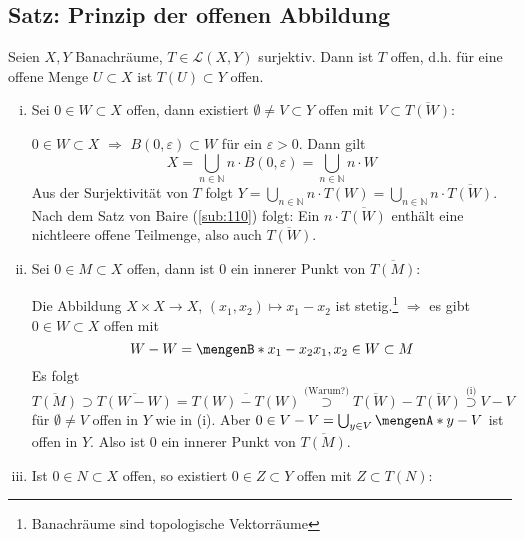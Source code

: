 \subsection{Satz: Prinzip der offenen Abbildung} %
\label{sub:38}
Seien $X,Y$ Banachräume, $T \in \mathcal{L}(X,Y)$ surjektiv. Dann ist $T$ offen, d.h. für eine offene Menge $U \subset X$ ist $T(U) \subset Y$ offen.
\begin{enumerate}[(i)]
	\item Sei $0 \in W \subset X$ offen, dann existiert $\emptyset \not= V \subset Y$ offen mit $V \subset \overline{T(W)}$: 
	
	$0 \in W \subset X$ $\Rightarrow $ $B(0,\varepsilon) \subset W$ für ein $\varepsilon>0$. Dann gilt
	\[
		X=\bigcup_{n \in \mathds{N}} n \cdot B(0,\varepsilon) = \bigcup_{n \in \mathds{N}} n \cdot W
	\]
	Aus der Surjektivität von $T$ folgt $Y = \bigcup_{n \in \mathds{N} }n \cdot T(W) = \bigcup_{n \in \mathds{N}} n \cdot \overline{T(W)}$. Nach dem Satz von Baire 
	(\ref{sub:110}) folgt: Ein $n \cdot \overline{T(W)}$ enthält eine nichtleere offene Teilmenge, also auch $\overline{T(W)}$.
	\item Sei $0 \in M \subset X$ offen, dann ist $0$ ein innerer Punkt von $\overline{T(M)}$: 
	
	Die Abbildung $X \times X \to X$, $(x_1,x_2) \mapsto x_1 -x_2$ ist stetig.\footnote{Banachräume sind topologische Vektorräume} $\Rightarrow$ es gibt $0 \in W \subset X$ 
	offen mit
	\[
		W - W = \set[x_1 -x_2]{x_1,x_2 \in W} \subset M 
	\]
	Es folgt 
	\[
		\overline{T(M)} \supset \overline{T(W-W)} = \overline{T(W)- T(W)} \stackrel{\text{(Warum?)}}{\supset} \overline{T(W)}- \overline{T(W)} \stackrel{\text{(i)}}{\supset}
		V -V
	\]
	für $\emptyset \not= V$ offen in $Y$ wie in (i). Aber $0 \in V-V = \bigcup_{y \in V}\set{y}- V$ ist offen in $Y$. Also ist $0$ ein innerer Punkt von $\overline{T(M)}$.
	\item Ist $0 \in N \subset X$ offen, so existiert $0 \in Z \subset Y$ offen mit $Z \subset T(N)$:
	

\end{enumerate}
